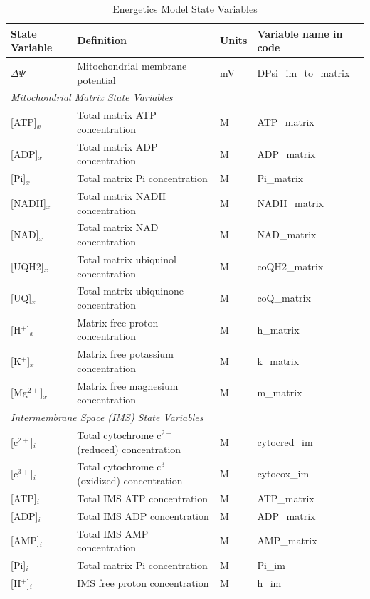 \documentclass[fleqn,10pt]{physiome}
\begin{document}
\begin{table}[ht]\centering
\caption{Energetics Model State Variables}\label{tab:1}
\begin{tabular}{l l l l}
\toprule
State Variable  & Definition & Units & Variable name in code \\
\midrule
$\Delta\Psi$    & Mitochondrial membrane potential      & mV & DPsi\_im\_to\_matrix \\
\multicolumn{4}{l}{\em Mitochondrial Matrix State Variables} \\
{[ATP]}$_x$       & Total matrix ATP concentration        & M  & ATP\_matrix \\
{[ADP]}$_x$       & Total matrix ADP concentration        & M  & ADP\_matrix \\
{[Pi]}$_x$        & Total matrix Pi concentration         & M  & Pi\_matrix \\
{[NADH]}$_x$      & Total matrix NADH concentration       & M  & NADH\_matrix \\
{[NAD]}$_x$       & Total matrix NAD concentration        & M  & NAD\_matrix \\
{[UQH2]}$_x$      & Total matrix ubiquinol concentration  & M  & coQH2\_matrix \\
{[UQ]}$_x$        & Total matrix ubiquinone concentration & M  & coQ\_matrix \\
{[H$^+$]}$_x$     & Matrix free proton concentration      & M  & h\_matrix \\
{[K$^+$]}$_x$     & Matrix free potassium concentration   & M  & k\_matrix \\
{[Mg$^{2+}$]}$_x$ & Matrix free magnesium concentration   & M  & m\_matrix \\
\multicolumn{4}{l}{\em Intermembrane Space (IMS) State Variables} \\
{[c$^{2+}$]}$_i$  & Total cytochrome c$^{2+}$ (reduced) concentration & M  & cytocred\_im \\
{[c$^{3+}$]}$_i$  & Total cytochrome c$^{3+}$ (oxidized) concentration & M  & cytocox\_im \\
{[ATP]}$_i$       & Total IMS ATP concentration      & M  & ATP\_matrix \\
{[ADP]}$_i$       & Total IMS ADP concentration      & M  & ADP\_matrix \\
{[AMP]}$_i$       & Total IMS AMP concentration      & M  & AMP\_matrix \\
{[Pi]}$_i$        & Total matrix Pi concentration    & M  & Pi\_im \\
{[H$^+$]}$_i$     & IMS free proton concentration    & M  & h\_im \\

\end{tabular}
\end{table}
\end{document}
